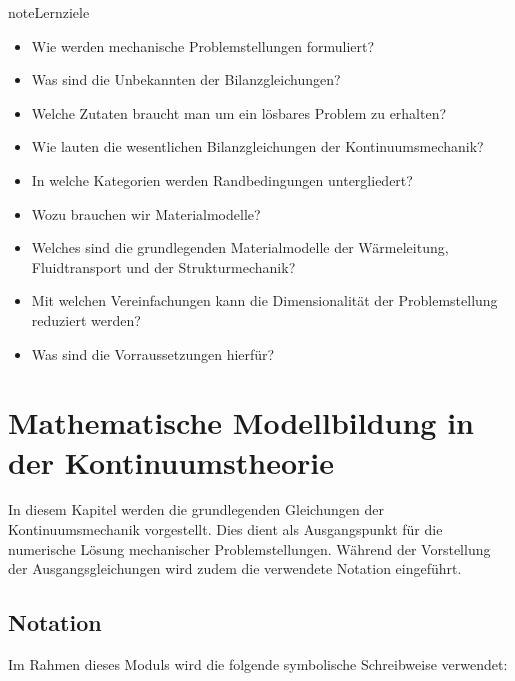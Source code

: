 \documentclass[letterpaper,10pt,german]{jupyterBook}
\begin{document}
\begin{sphinxadmonition}{note}{Lernziele}
\begin{itemize}
\item {} 
\sphinxAtStartPar
Wie werden mechanische Problemstellungen formuliert?

\item {} 
\sphinxAtStartPar
Was sind die Unbekannten der Bilanzgleichungen?

\item {} 
\sphinxAtStartPar
Welche Zutaten braucht man um ein lösbares Problem zu erhalten?

\item {} 
\sphinxAtStartPar
Wie lauten die wesentlichen Bilanzgleichungen der Kontinuumsmechanik?

\item {} 
\sphinxAtStartPar
In welche Kategorien werden Randbedingungen untergliedert?

\item {} 
\sphinxAtStartPar
Wozu brauchen wir Materialmodelle?

\item {} 
\sphinxAtStartPar
Welches sind die grundlegenden Materialmodelle der Wärmeleitung, Fluidtransport und der Strukturmechanik?

\item {} 
\sphinxAtStartPar
Mit welchen Vereinfachungen kann die Dimensionalität der Problemstellung reduziert werden?

\item {} 
\sphinxAtStartPar
Was sind die Vorraussetzungen hierfür?

\end{itemize}
\end{sphinxadmonition}


\section{Mathematische Modellbildung in der Kontinuumstheorie}
\label{\detokenize{chapters/chapter1/elasticity:mathematische-modellbildung-in-der-kontinuumstheorie}}\label{\detokenize{chapters/chapter1/elasticity::doc}}
\sphinxAtStartPar
In diesem Kapitel werden die grundlegenden Gleichungen der Kontinuumsmechanik vorgestellt. Dies dient als Ausgangspunkt für die numerische Lösung mechanischer Problemstellungen. Während der Vorstellung der Ausgangsgleichungen wird zudem die verwendete Notation eingeführt.


\subsection{Notation}
\label{\detokenize{chapters/chapter1/elasticity:notation}}
\sphinxAtStartPar
Im Rahmen dieses Moduls wird die folgende symbolische Schreibweise verwendet:
\end{document}
